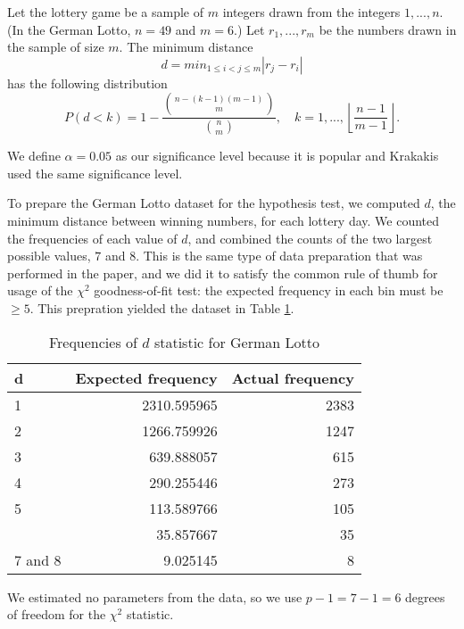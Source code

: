 Let the lottery game be a sample of $m$ integers drawn from the integers $1,...,n$. 
(In the German Lotto, $n = 49$ and $m = 6$.) Let  $r_1,...,r_m$ be the numbers drawn in the sample of size $m$.
The minimum distance
\begin{equation}
    d = min_{1 \leq i < j \leq m} | r_j - r_i |
\end{equation}
has the following distribution
\begin{equation}
     P(d < k) = 1 - \frac{{n - (k - 1)(m - 1) \choose m}}{{n \choose m}}, \quad k = 1,..., \left\lfloor \frac{n - 1}{m - 1} \right\rfloor.
\end{equation}

We define $\alpha = 0.05$ as our significance level because it is popular and Krakakis used
the same significance level.

To prepare the German Lotto dataset for the hypothesis test, we computed $d$, the minimum distance between winning numbers, for each 
lottery day. We counted the frequencies of each value of $d$, and combined the counts of the 
two largest possible values, $7$ and $8$. This is the same type of data preparation that was performed in the paper,
and we did it to satisfy the common rule of thumb for usage of the 
$\chi^2$ goodness-of-fit test: the expected frequency in each bin must be $\geq 5$. This prepration yielded the dataset in Table \ref{tab:frequencies}.

\begin{table}
    \centering
    \caption{Frequencies of $d$ statistic for German Lotto}
    \begin{tabular}[t]{lrr}
        \toprule
        d & Expected frequency & Actual frequency\\
        \midrule
        1 & 2310.595965 & 2383\\
        2 & 1266.759926 & 1247\\
        3 & 639.888057 & 615\\
        4 & 290.255446 & 273\\
        5 & 113.589766 & 105\\
        \addlinespace
        6 & 35.857667 & 35\\
        7 and 8 & 9.025145 & 8\\
        \bottomrule
    \end{tabular}
    \label{tab:frequencies}
\end{table}

We estimated no parameters from the data, so we use
$p - 1 = 7 - 1 = 6$ degrees of freedom for the $\chi^2$ statistic.
